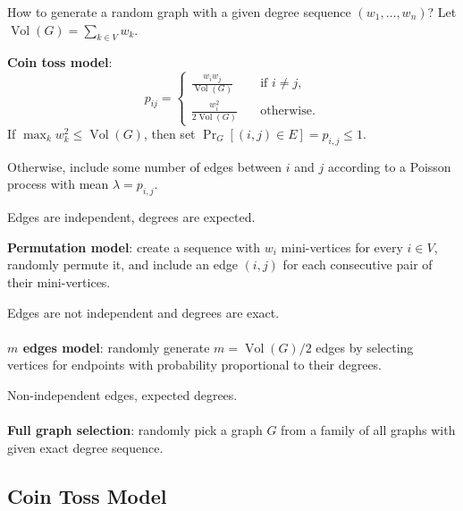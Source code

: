 \documentclass{beamer}
\DeclareMathOperator*{\Vol}{Vol}
\newcommand{\autotitle}{\secname\ifdefempty{\subsecname}{}{~--- \subsecname}}
\begin{document}
\begin{frame}{\autotitle}
    How to generate a random graph with a given degree sequence $(w_1,\ldots,w_n)$?
    Let $\Vol(G)=\sum_{k\in V}{w_k}$.

    \textbf{Coin toss model}:
    \begin{equation*}
        p_{ij}=
        \begin{cases}
            \frac{w_i w_j}{\Vol(G)} & \quad \text{if }i\neq j,\\
            \frac{w_i^2}{2\Vol(G)} & \quad \text{otherwise}.
        \end{cases}
    \end{equation*}
    If $\max_k w_k^2\leq\Vol(G)$, then set $\Pr_G[(i,j)\in E]=p_{i,j}\leq 1$.
    
    Otherwise, include some number of edges between $i$ and $j$
    according to a Poisson process with mean $\lambda=p_{i,j}$.
    
    Edges are independent, degrees are expected.
\end{frame}

\begin{frame}{\autotitle}
    \textbf{Permutation model}:
    create a sequence with $w_i$ mini-vertices for every $i\in V$,
    randomly permute it, and include an edge $(i,j)$ for each
    consecutive pair of their mini-vertices.
    
    Edges are not independent and degrees are exact.\\~\\
    
    \textbf{$m$ edges model}:
    randomly generate $m=\Vol(G)/2$ edges by
    selecting vertices for endpoints with probability proportional to their degrees.
    
    Non-independent edges, expected degrees.\\~\\
    
    \textbf{Full graph selection}:
    randomly pick a graph $G$ from a family of all graphs with
    given exact degree sequence.
\end{frame}

\subsection{Coin Toss Model}
\end{document}
